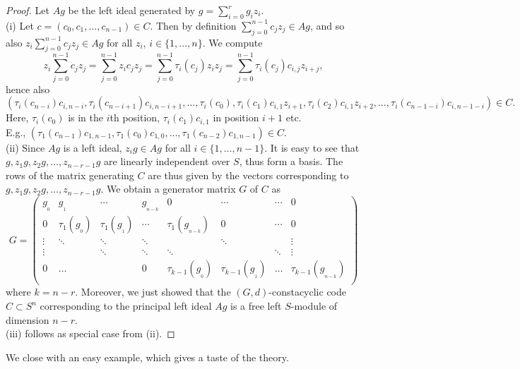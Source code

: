 \documentclass[11pt]{amsart}
\theoremstyle{plain}
\theoremstyle{definition}
\begin{document}
\begin{proof}
Let $Ag$ be the left ideal generated by $g=\sum_{i=0}^r g_iz_i$.
\\ (i) Let $c=(c_0,c_1,\dots,c_{n-1}) \in  C$. Then by definition $\sum_{j=0}^{n-1}c_jz_j\in Ag$, and so also $z_i \sum_{j=0}^{n-1}c_jz_j\in Ag$ for all $z_i$, $i\in \{1,\dots,n \}$.
We compute
$$z_i \sum_{j=0}^{n-1}c_jz_j= \sum_{j=0}^{n-1}z_i c_jz_j= \sum_{j=0}^{n-1} \tau_i(c_j) z_iz_j= \sum_{j=0}^{n-1} \tau_i(c_j) c_{i,j} z_{i+j},$$
 hence
also
 $$( \tau_i(c_{n-i}) c_{i,n-i}  ,  \tau_i(c_{n-i+1}) c_{i,n-i+1} ,\dots, \tau_i(c_0), \tau_i(c_1) c_{i,1} z_{i+1}, \tau_i(c_2) c_{i,1} z_{i+2},\dots, \tau_i(c_{n-1-i}) c_{i,n-1-i} ) \in  C.$$
 Here, $ \tau_i(c_0) $ is in the $i$th position, $\tau_i(c_1) c_{i,1} $ in position $i+1$ etc.
 \\
E.g., $(  \tau_1(c_{n-1}) c_{1,n-1} , \tau_1(c_0) c_{1,0} ,\dots,  \tau_1(c_{n-2}) c_{1,n-1} ) \in  C$.
\\ (ii)
Since $Ag$ is a left ideal, $z_ig\in Ag$ for all $i\in \{1,\dots,n-1\}.$
It is easy to see that $g,z_1g,z_2g,\dots, z_{n-r-1}g$ are linearly independent over $S$, thus form a basis. The rows of the matrix generating $ C$ are thus given by the vectors corresponding to $g,z_1g,z_2g,\dots, z_{n-r-1}g$. We obtain
a generator matrix $ G $ of $ C$ as
 \begin{equation}\label{eq10}
 G= \left(
 \begin{array}{cccccccc}
 g_{_0} &g_{_1} &\cdots&g_{_{n-k}}& 0 &\cdots &\cdots & 0\\
 0 & \tau_1(g_{_0}) & \tau_1(g_{_1}) &\cdots & \tau_{1}(g_{_{n-k}}) & 0 &\cdots & 0\\
 \vdots &\ddots &\ddots &\ddots & &\ddots & &\vdots\\
 \vdots & &\ddots &\ddots &\ddots & &\ddots &\vdots\\
 0 &\ldots & &0 & \tau_{k-1}(g_{_0}) & \tau_{k-1}(g_{_1}) &\ldots & \tau_{k-1}(g_{_{n-k}})\\
 \end{array}
 \right)
 \end{equation}
 where $k=n-r $.
 Moreover, we just showed that the $(G,d)$-constacyclic code $ C\subset S^n$ corresponding to the principal left ideal
$Ag $ is a free left $S$-module of dimension $n-r$.
\\ (iii) follows as special case from (ii).
\end{proof}

We close with an easy example, which gives a taste of the theory.
\end{document}
